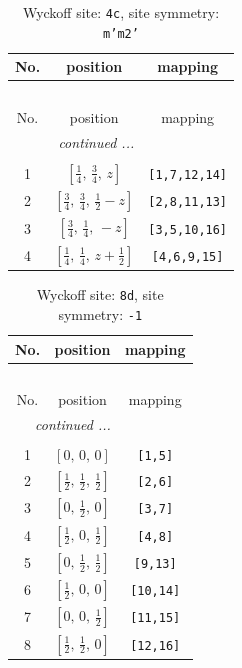 \documentclass[fleqn,8pt]{jsarticle}
\begin{document}
\renewcommand{\arraystretch}{1.2}
\begin{longtable}{ccc}
\caption{Wyckoff site: {\tt 4c}, site symmetry: {\tt m'm2'}}
 \\
 \hline \hline
No. & position & mapping \\ \hline \endfirsthead

\multicolumn{2}{l}{\tablename\ \thetable{}} \\
 \hline \hline
No. & position & mapping \\ \hline \endhead

 \hline \hline
\multicolumn{2}{r}{\footnotesize\it continued ...} \\ \endfoot

 \hline \hline
\multicolumn{2}{r}{} \\ \endlastfoot

1 & $\left[ \frac{1}{4},\, \frac{3}{4},\, z \right]$ & {\tt [1,7,12,14]} \\ \hline
2 & $\left[ \frac{3}{4},\, \frac{3}{4},\, \frac{1}{2} - z \right]$ & {\tt [2,8,11,13]} \\ \hline
3 & $\left[ \frac{3}{4},\, \frac{1}{4},\, - z \right]$ & {\tt [3,5,10,16]} \\ \hline
4 & $\left[ \frac{1}{4},\, \frac{1}{4},\, z + \frac{1}{2} \right]$ & {\tt [4,6,9,15]} \\
\end{longtable}
\renewcommand{\arraystretch}{1.2}
\begin{longtable}{ccc}
\caption{Wyckoff site: {\tt 8d}, site symmetry: {\tt -1}}
 \\
 \hline \hline
No. & position & mapping \\ \hline \endfirsthead

\multicolumn{2}{l}{\tablename\ \thetable{}} \\
 \hline \hline
No. & position & mapping \\ \hline \endhead

 \hline \hline
\multicolumn{2}{r}{\footnotesize\it continued ...} \\ \endfoot

 \hline \hline
\multicolumn{2}{r}{} \\ \endlastfoot

1 & $\left[ 0,\, 0,\, 0 \right]$ & {\tt [1,5]} \\ \hline
2 & $\left[ \frac{1}{2},\, \frac{1}{2},\, \frac{1}{2} \right]$ & {\tt [2,6]} \\ \hline
3 & $\left[ 0,\, \frac{1}{2},\, 0 \right]$ & {\tt [3,7]} \\ \hline
4 & $\left[ \frac{1}{2},\, 0,\, \frac{1}{2} \right]$ & {\tt [4,8]} \\ \hline
5 & $\left[ 0,\, \frac{1}{2},\, \frac{1}{2} \right]$ & {\tt [9,13]} \\ \hline
6 & $\left[ \frac{1}{2},\, 0,\, 0 \right]$ & {\tt [10,14]} \\ \hline
7 & $\left[ 0,\, 0,\, \frac{1}{2} \right]$ & {\tt [11,15]} \\ \hline
8 & $\left[ \frac{1}{2},\, \frac{1}{2},\, 0 \right]$ & {\tt [12,16]} \\
\end{longtable}
\end{document}
